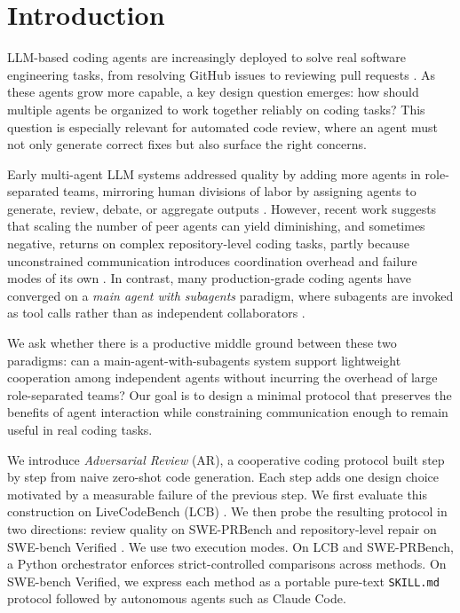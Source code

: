\documentclass{article}
\begin{document}
\section{Introduction}
\label{sec:intro}
LLM-based coding agents are increasingly deployed to solve real software engineering tasks, from resolving GitHub issues to reviewing pull requests \citep{swebench}. As these agents grow more capable, a key design question emerges: how should multiple agents be organized to work together reliably on coding tasks? This question is especially relevant for automated code review, where an agent must not only generate correct fixes but also surface the right concerns.
 
Early multi-agent LLM systems addressed quality by adding more agents in role-separated teams, mirroring human divisions of labor by assigning agents to generate, review, debate, or aggregate outputs \citep{mapcoder, agentcoder, codecor, codesim}. However, recent work suggests that scaling the number of peer agents can yield diminishing, and sometimes negative, returns on complex repository-level coding tasks, partly because unconstrained communication introduces coordination overhead and failure modes of its own \citep{smit2023mad, scaling-agents}. In contrast, many production-grade coding agents have converged on a \emph{main agent with subagents} paradigm, where subagents are invoked as tool calls rather than as independent collaborators \citep{anthropic-agents}.

We ask whether there is a productive middle ground between these two paradigms: can a main-agent-with-subagents system support lightweight cooperation among independent agents without incurring the overhead of large role-separated teams? Our goal is to design a minimal protocol that preserves the benefits of agent interaction while constraining communication enough to remain useful in real coding tasks.

We introduce \emph{Adversarial Review} (AR), a cooperative coding protocol built step by step from naive zero-shot code generation. Each step adds one design choice motivated by a measurable failure of the previous step. We first evaluate this construction on LiveCodeBench (LCB) \citep{livecodebench2024}. We then probe the resulting protocol in two directions: review quality on SWE-PRBench \citep{swe-prbench2026} and repository-level repair on SWE-bench Verified \citep{swebench}. We use two execution modes. On LCB and SWE-PRBench, a Python orchestrator enforces strict-controlled comparisons across methods. On SWE-bench Verified, we express each method as a portable pure-text \texttt{SKILL.md} protocol followed by autonomous agents such as Claude Code.
\end{document}
